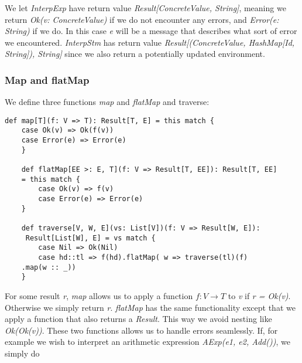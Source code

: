 We let \textsl{InterpExp} have return value \textsl{Result[ConcreteValue, String]}, meaning we return \textsl{Ok(v: ConcreteValue)} if we do not encounter any errors, and \textsl{Error(e: String)} if we do. In this case \textsl{e} will be a message that describes what sort of error we encountered. \textsl{InterpStm} has return value 
 \textsl{Result[(ConcreteValue, HashMap[Id, String]), String]} since we also return a potentially updated environment. 

\subsubsection{Map and flatMap}

We define three functions \textsl{map} and \textsl{flatMap} and traverse:

\begin{lstlisting}[style=simple]
	def map[T](f: V => T): Result[T, E] = this match {
	case Ok(v) => Ok(f(v))
	case Error(e) => Error(e)
	}
	
	def flatMap[EE >: E, T](f: V => Result[T, EE]): Result[T, EE] 
	= this match {
		case Ok(v) => f(v)
		case Error(e) => Error(e)
	}
	
	def traverse[V, W, E](vs: List[V])(f: V => Result[W, E]):
	 Result[List[W], E] = vs match {
		case Nil => Ok(Nil)
		case hd::tl => f(hd).flatMap( w => traverse(tl)(f)
	.map(w :: _))
	}
\end{lstlisting}
For some result \textsl{r}, \textsl{map} allows us to apply a function $f: V \rightarrow T$ to \textsl{v} if \textsl{r = Ok(v)}. Otherwise we simply return \textsl{r}. \textsl{flatMap} has the same functionality except that we apply a function that also returns a \textsl{Result}. This way we avoid nesting like \textsl{Ok(Ok(v))}. These two functions allows us to handle errors seamlessly. If, for example we wish to interpret an arithmetic expression \textsl{AExp(e1, e2, Add())}, we simply do 

